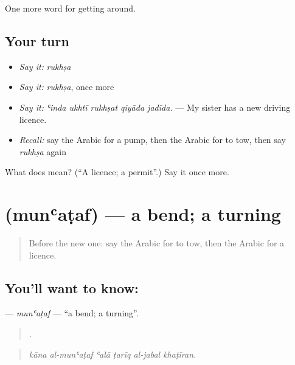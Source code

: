 \begin{grammarlens}[title={What you've built}]
One more word for getting around.
\end{grammarlens}

\subsection*{Your turn}
\begin{itemize}
\raggedright
  \item \emph{Say it:} \emph{rukhṣa}
  \item \emph{Say it:} \emph{rukhṣa}, once more
  \item \emph{Say it:} \emph{ʿinda ukhtī rukhṣat qiyāda jadīda.} — My sister has a new driving licence.
  \item \emph{Recall:} say the Arabic for a pump, then the Arabic for to tow, then say \emph{rukhṣa} again
\end{itemize}

\begin{tcolorbox}[breakable,colback=teal!4,colframe=teal!35!black,title={Before you move on}]
What does  mean? (\textquotedblleft{}A licence; a permit\textquotedblright{}.) Say it once more.
\end{tcolorbox}
\section[\texorpdfstring{\ar{منعطف} (munʿaṭaf)}{منعطف (munʿaṭaf)}]{ (munʿaṭaf) — a bend; a turning}

\label{lesson:AR-C434-munataf}



\begin{quote}
Before the new one: say the Arabic for to tow, then the Arabic for a licence.
\end{quote}

\subsection*{You'll want to know: }
\textbf{} — \emph{munʿaṭaf} — \textquotedblleft{}a bend; a turning\textquotedblright{}.

\begin{quote}
     .
\end{quote}

\begin{quote}
\emph{kāna al-munʿaṭaf ʿalā ṭarīq al-jabal khaṭīran.}
\end{quote}

